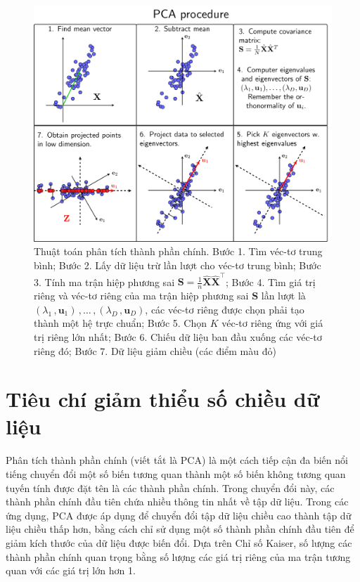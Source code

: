 \documentclass[../thesis.tex]{subfiles}
\begin{document}
\begin{figure}[H]
	\centering
	\includegraphics[width=0.8\linewidth]{images/pca_procedure}
	\caption[Thuật toán phân tích thành phần chính]{Thuật toán phân tích thành phần chính. Bước 1. Tìm véc-tơ trung bình; Bước 2. Lấy dữ liệu trừ lần lượt cho véc-tơ trung bình; Bước 3. Tính ma trận hiệp phương sai $ \mathbf{S} = \frac{1}{n}\widehat{\mathbf{X}} \widehat{\mathbf{X}}^\top $; Bước 4. Tìm giá trị riêng và véc-tơ riêng của ma trận hiệp phương sai $ \mathbf{S} $ lần lượt là $ (\lambda_1\,,\mathbf{u}_1)\,,\ldots\,,(\lambda_D\,,\mathbf{u}_D) $, các véc-tơ riêng được chọn phải tạo thành một hệ trực chuẩn; Bước 5. Chọn $ K $ véc-tơ riêng ứng với giá trị riêng lớn nhất; Bước 6. Chiếu dữ liệu ban đầu xuống các véc-tơ riêng đó; Bước 7. Dữ liệu giảm chiều (các điểm màu đỏ)}
	\label{fig:pcaprocedure}
\end{figure}

\section{Tiêu chí giảm thiểu số chiều dữ liệu}
Phân tích thành phần chính (viết tắt là PCA) là một cách tiếp cận đa biến nổi tiếng chuyển đổi một số biến tương quan thành một số biến không tương quan tuyến tính được đặt tên là các thành phần chính. Trong chuyển đổi này, các thành phần chính đầu tiên chứa nhiều thông tin nhất về tập dữ liệu. Trong các ứng dụng, PCA được áp dụng để chuyển đổi tập dữ liệu chiều cao thành tập dữ liệu chiều thấp hơn, bằng cách chỉ sử dụng một số thành phần chính đầu tiên để giảm kích thước của dữ liệu được biến đổi. Dựa trên Chỉ số Kaiser, số lượng các thành phần chính quan trọng bằng số lượng các giá trị riêng của ma trận tương quan với các giá trị lớn hơn 1.
\end{document}
